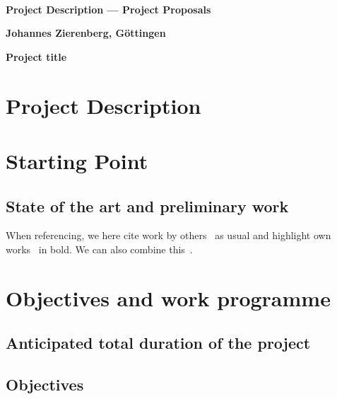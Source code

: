 \documentclass[12pt]{scrartcl}
\begin{document}
\thispagestyle{plain}
\mbox{ }

\vspace{-1cm}
\noindent
\textbf{\large
  Project Description --- Project Proposals
}

\vspace{0.5cm}
\noindent
\textbf{\large
  Johannes Zierenberg, G\"ottingen
}

\vspace{0.5cm}
\noindent
\textbf{\large
 Project title
}
\\
\vspace{-0.5cm}
\noindent\makebox[\linewidth]{\rule{\textwidth}{0.4pt}}


\section*{Project Description}

\section{Starting Point}
\subsection*{State of the art and preliminary work}
When referencing, we here cite work by others~\cite{author_2023} as usual and highlight own works~\cite{zierenberg_homeostatic_2018} in bold.
We can also combine this~\cite{author_2023, zierenberg_homeostatic_2018}.


\section{Objectives and work programme}

\subsection{Anticipated total duration of the project}

\subsection{Objectives}
\end{document}
